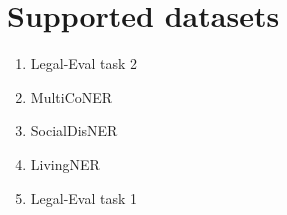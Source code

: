 \documentclass{article}
\begin{document}
\section{Supported datasets}
\begin{enumerate}
  \item Legal-Eval task 2
  \item MultiCoNER
  \item SocialDisNER
  \item LivingNER
  \item Legal-Eval task 1
\end{enumerate}
\end{document}
